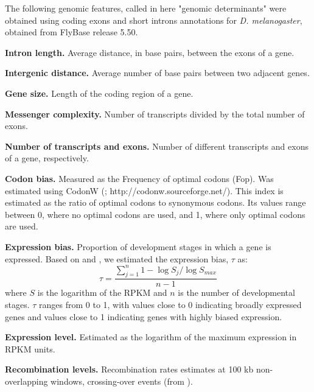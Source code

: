 
The following genomic features, called in here "genomic determinants" were obtained using coding exons and short introns annotations for \textit{D. melanogaster}, obtained from FlyBase release 5.50. 

\textbf{Intron length.} Average distance, in base pairs, between the exons of a gene.

\textbf{Intergenic distance.} Average number of base pairs between two adjacent genes.

\textbf{Gene size.} Length of the coding region of a gene.

\textbf{Messenger complexity.} Number of transcripts divided by the total number of exons.

\textbf{Number of transcripts and exons.} Number of different transcripts and exons of a gene, respectively.

\textbf{Codon bias.} Measured as the Frequency of optimal codons (Fop). Was estimated using CodonW (\citealp{Peden1999}; http://codonw.sourceforge.net/).
This index is estimated as the ratio of optimal codons to synonymous codons. Its values range between 0, where no optimal codons are used, and 1, where only optimal codons are used.

\textbf{Expression bias.} Proportion of development stages in which a gene is expressed. Based on \citep{Yanai2005} and \citep{Larracuente2008}, we estimated the expression bias, $\tau$ as:
%
$$ \tau = \frac{ \sum_{j=1}^{n} 1- \log S_{j} / \log S_{max} }  { n-1 } $$
%
where $S$ is the logarithm of the RPKM and $n$ is the number of developmental stages. $\tau$ ranges from 0 to 1, with values close to 0 indicating broadly expressed genes and values close to 1 indicating genes with highly biased expression.

\textbf{Expression level.} Estimated as the logarithm of the maximum expression in RPKM units.

\textbf{Recombination levels.} Recombination rates estimates at 100 kb non-overlapping windows, crossing-over events (from \citealp{Comeron2012}).

